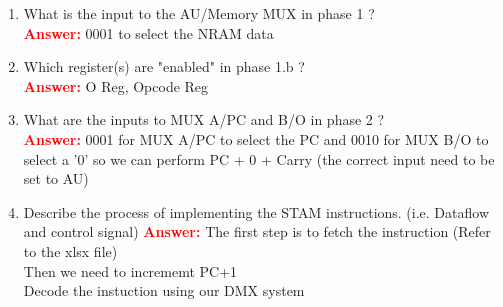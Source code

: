 \documentclass[a4paper, 11pt]{article}
\begin{document}
\begin{enumerate}
    \item What is the input to the AU/Memory MUX in phase 1  ? \\
     \textcolor{red}{\textbf{Answer:}} 0001 to select the NRAM data\\
    \item Which register(s) are "enabled" in phase 1.b ? \\
    \textcolor{red}{\textbf{Answer:}} O Reg, Opcode Reg\\
    \item What are the inputs to MUX A/PC and B/O in phase 2 ? \\
    \textcolor{red}{\textbf{Answer:}} 0001 for MUX A/PC to select the PC and 0010 for MUX B/O to select a '0' so we can perform PC + 0 + Carry (the correct input need to be set to AU)\\
    \item Describe the process of implementing the STAM instructions. (i.e. Dataflow and control signal)
    \textcolor{red}{\textbf{Answer:}} 
    The first step is to fetch the instruction  (Refer to the  xlsx file) \\
    Then we need to incrememt PC+1 \\
    Decode the instuction using our DMX system\\
\end{enumerate}
%
\end{document}
